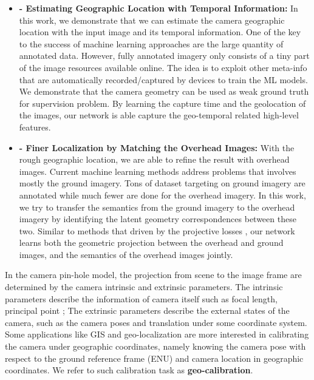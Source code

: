 \begin{itemize}[noitemsep]
  \item \textbf{ -
  Estimating Geographic Location with Temporal Information:} \newline \newline
  In this work, we demonstrate that we can estimate the camera geographic
  location with the input image and its temporal information.
  One of the key to the success of machine learning approaches are the
  large quantity of annotated data. However, fully annotated imagery
  only consists of a tiny part of the image resources available online.
  The idea is to exploit other meta-info that are automatically
  recorded/captured by devices to train the ML models. We demonstrate
  that the camera geometry can be used as weak ground truth for
  supervision problem. By learning the capture time and the geolocation
  of the images, our network is able capture the geo-temporal related
  high-level features. \newline

  \item \textbf{ -
  Finer Localization by Matching the Overhead Images:} \newline \newline
  With the rough geographic location, we are able to refine the result
  with overhead images.
  Current machine learning methods address problems that involves mostly
  the ground imagery. Tons of dataset targeting on ground imagery are
  annotated while much fewer are done for the overhead imagery.
  In this work, we try to transfer the semantics from the ground imagery
  to the overhead imagery by identifying the latent geometry
  correspondences between these two. Similar to methods that driven by
  the projective losses , our network learns 
  both the geometric projection between the overhead and ground
  images, and the semantics of the overhead images jointly. \newline


\end{itemize}




In the camera pin-hole model, the projection from scene to the image
frame are determined by the camera intrinsic and extrinsic parameters. 
The intrinsic parameters describe the information of camera
itself such as focal length, principal point \etc; 
The extrinsic parameters describe the external states of the
camera, such as the camera poses and translation under some
coordinate system.
Some applications like GIS and geo-localization are more interested in
calibrating the camera under geographic coordinates, namely knowing
the camera pose with respect to the ground reference frame (\ie ENU)
and camera location in geographic coordinates. We refer to such
calibration task as \textbf{geo-calibration}.

